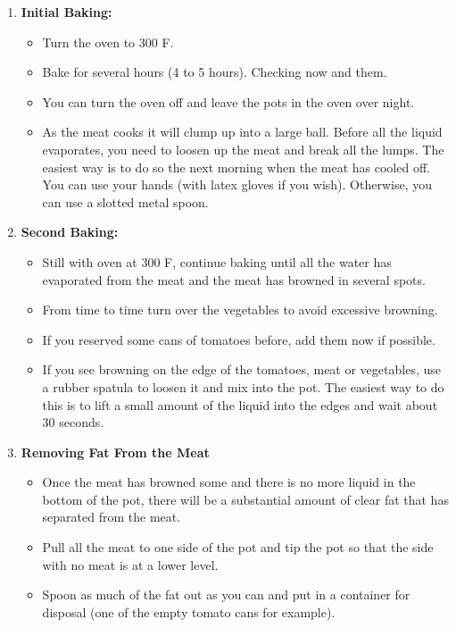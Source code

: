 \documentclass[11pt,letterpaper]{article}
\begin{document}
\begin{description}
\begin{enumerate}
	\item {\bf Initial Baking:}
		\begin{itemize}
		\item Turn the oven to 300 F.
		\item Bake for several hours (4 to 5 hours). Checking now and them.
		\item You can turn the oven off and leave the pots in the oven over night.
		\item As the meat cooks it will clump up into a large ball. Before all the liquid evaporates, you need to loosen up the meat and break all the lumps. The easiest way is to do so the next morning when the meat has cooled off. You can use your hands (with latex gloves if you wish). Otherwise, you can use a slotted metal spoon.
		\end{itemize}
		\item {\bf Second Baking:}
		\begin{itemize}
		\item Still with oven at 300 F, continue baking until all the water has evaporated from the meat and the meat has browned in several spots. 
		\item From time to time turn over the vegetables to avoid excessive browning.
		\item If you reserved some cans of tomatoes before, add them now if possible.
		\item If you see browning on the edge of the tomatoes, meat or vegetables, use a rubber spatula to loosen it and mix into the pot. The easiest way to do this is to lift a small amount of the liquid into the edges and wait about 30  seconds.
		\end{itemize}
	\item {\bf Removing Fat From the Meat}
		 \begin{itemize}
		\item Once the meat has browned some and there is no more liquid in the bottom of the pot, there will be a substantial amount of clear fat that has separated from the meat.
		\item Pull all the meat to one side of the pot and tip the pot so that the side with no meat is at a lower level.
		\item Spoon as much of the fat out as you can and put in a container for disposal (one of the empty tomato cans for example).
		\end{itemize}


\end{enumerate}
\end{description}
\end{document}
